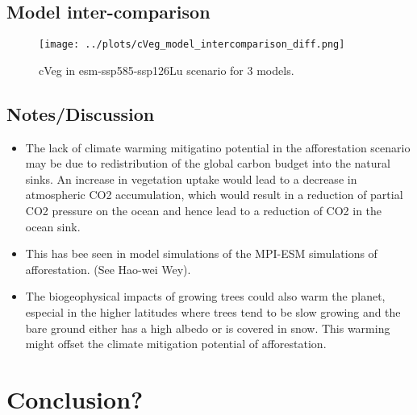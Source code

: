 \documentclass[]{article}
\begin{document}
\subsection{Model inter-comparison}

\begin{figure}[H]
    \centering
    \texttt{[image: ../plots/cVeg\_model\_intercomparison\_diff.png]}
    \caption{cVeg in esm-ssp585-ssp126Lu scenario for 3 models.}
    \label{fig:models}
\end{figure}

\subsection{Notes/Discussion}

\begin{itemize}
    \item The lack of climate warming mitigatino potential in the afforestation scenario may be due to redistribution of the global carbon budget into the natural sinks.
        An increase in vegetation uptake would lead to a decrease in atmospheric CO2 accumulation, which would result in a reduction of partial CO2 pressure on the ocean and hence lead to a reduction of CO2 in the ocean sink.
    \item This has bee seen in model simulations of the MPI-ESM simulations of afforestation. (See Hao-wei Wey).
    \item The biogeophysical impacts of growing trees could also warm the planet, especial in the higher latitudes where trees tend to be slow growing and the bare ground either has a high albedo or is covered in snow. This warming might offset the climate mitigation potential of afforestation.
\end{itemize}

\section{Conclusion?}

\printbibliography
\end{document}
